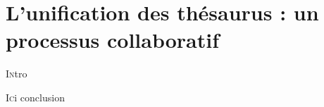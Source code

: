\chapter[Gérer la prolifération]{\label{III-B} L'unification des thésaurus : un processus collaboratif}



\lettrine{I}ntro





\bigskip
\bigskip
\bigskip

\lettrine{I}ci conclusion